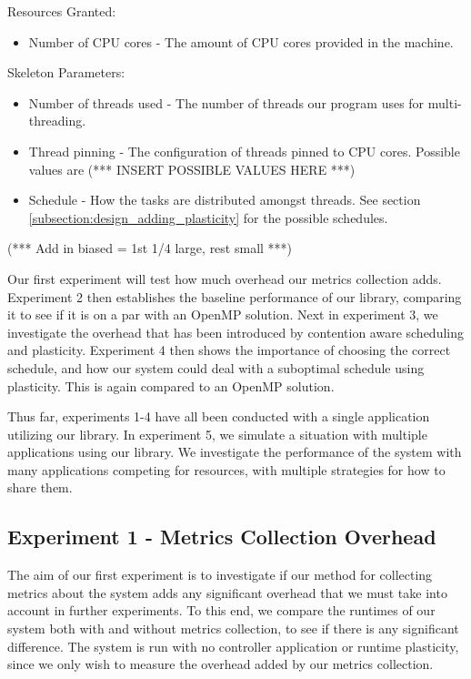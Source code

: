 Resources Granted:

\begin{itemize}
	\item Number of CPU cores - The amount of CPU cores provided in the machine.
\end{itemize}

Skeleton Parameters:

\begin{itemize}
	\item Number of threads used - The number of threads our program uses for multi-threading.
	\item Thread pinning - The configuration of threads pinned to CPU cores. Possible values are (*** INSERT POSSIBLE VALUES HERE ***)
	\item Schedule - How the tasks are distributed amongst threads. See section \ref{subsection:design_adding_plasticity} for the possible schedules.
\end{itemize}

(*** Add in biased = 1st 1/4 large, rest small ***)

Our first experiment will test how much overhead our metrics collection adds. Experiment 2 then establishes the baseline performance of our library, comparing it to see if it is on a par with an OpenMP solution. Next in experiment 3, we investigate the overhead that has been introduced by contention aware scheduling and plasticity. Experiment 4 then shows the importance of choosing the correct schedule, and how our system could deal with a suboptimal schedule using plasticity. This is again compared to an OpenMP solution.

Thus far, experiments 1-4 have all been conducted with a single application utilizing our library. In experiment 5, we simulate a situation with multiple applications using our library. We investigate the performance of the system with many applications competing for resources, with multiple strategies for how to share them.



\subsection{Experiment 1 - Metrics Collection Overhead}

The aim of our first experiment is to investigate if our method for collecting metrics about the system adds any significant overhead that we must take into account in further experiments. To this end, we compare the runtimes of our system both with and without metrics collection, to see if there is any significant difference. The system is run with no controller application or runtime plasticity, since we only wish to measure the overhead added by our metrics collection. 

